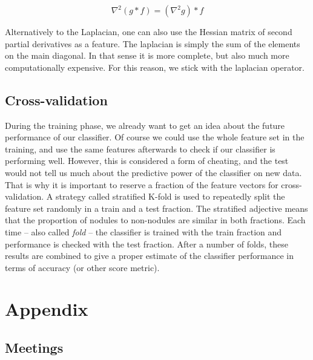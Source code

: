 \documentclass[titlepage, 10pt]{article}
\begin{document}
\begin{equation}
	\nabla^2(g * f) = (\nabla^2 g) * f %
\end{equation}

Alternatively to the Laplacian, one can also use the Hessian matrix of second
partial derivatives as a feature. The laplacian is simply the sum of the
elements on the main diagonal. In that sense it is more complete, but also much
more computationally expensive. For this reason, we stick with the laplacian
operator.


\subsection{Cross-validation}
During the training phase, we already want to get an idea about the future
performance of our classifier. Of course we could use the whole feature set in
the training, and use the same features afterwards to check if our classifier is
performing well. However, this is considered a form of cheating, and the test
would not tell us much about the predictive power of the classifier on new data.
That is why it is important to reserve a fraction of the feature vectors for
cross-validation. A strategy called stratified K-fold is used to repeatedly
split the feature set randomly in a train and a test fraction.
The stratified adjective means that the proportion of nodules to non-nodules are
similar in both fractions. Each time -- also called \textit{fold} -- the
classifier is trained with the train fraction and performance is checked with
the test fraction. After a number of folds, these results are combined to give a
proper estimate of the classifier performance in terms of accuracy (or other
score metric).





\clearpage
\appendix
\section{Appendix}
\subsection{Meetings}
%
%
%
%
%
%
%

\clearpage

\end{document}
